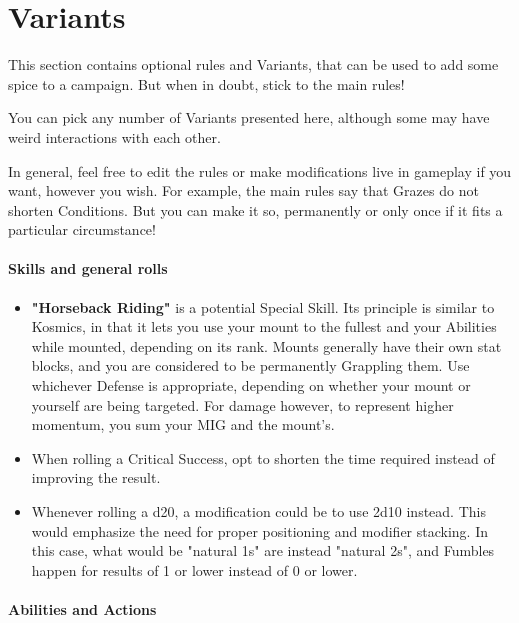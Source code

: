 \section{Variants}

This section contains optional rules and Variants, that can be used to add some spice to a campaign. But when in doubt, stick to the main rules!

You can pick any number of Variants presented here, although some may have weird interactions with each other.

\begin{rpg-examplebox}
    In general, feel free to edit the rules or make modifications live in gameplay if you want, however you wish. For example, the main rules say that Grazes do not shorten Conditions. But you can make it so, permanently or only once if it fits a particular circumstance!
\end{rpg-examplebox}


\paragraph{Skills and general rolls}

\begin{itemize}
    \item \textbf{"Horseback Riding"} is a potential Special Skill. Its principle is similar to Kosmics, in that it lets you use your mount to the fullest and your Abilities while mounted, depending on its rank. Mounts generally have their own stat blocks, and you are considered to be permanently Grappling them. Use whichever Defense is appropriate, depending on whether your mount or yourself are being targeted. For damage however, to represent higher momentum, you sum your MIG and the mount's.
    \item When rolling a Critical Success, opt to shorten the time required instead of improving the result.
    \item Whenever rolling a d20, a modification could be to use 2d10 instead. This would emphasize the need for proper positioning and modifier stacking. In this case, what would be "natural 1s" are instead "natural 2s", and Fumbles happen for results of 1 or lower instead of 0 or lower.
\end{itemize}

\paragraph{Abilities and Actions}

